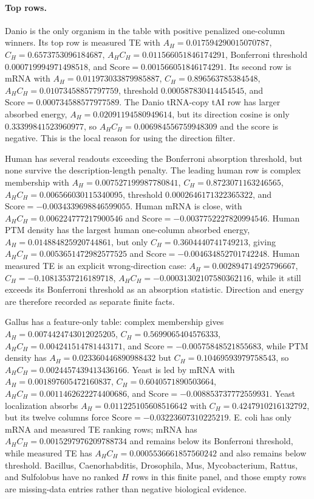 \paragraph{Top rows.}
Danio is the only organism in the table with positive penalized one-column winners.  Its top row is measured TE with $A_H=0.017594290015070787$, $C_H=0.6573753096184687$, $A_H C_H=0.011566051846174291$, Bonferroni threshold $0.000719994971498518$, and $\mathrm{Score}=0.001566051846174291$.  Its second row is mRNA with $A_H=0.011973033879985887$, $C_H=0.896563785384548$, $A_H C_H=0.01073458857797759$, threshold $0.000587830414454545$, and $\mathrm{Score}=0.000734588577977589$.  The Danio tRNA-copy tAI row has larger absorbed energy, $A_H=0.02091194580949614$, but its direction cosine is only $0.33399841523960977$, so $A_HC_H=0.006984556759948309$ and the score is negative.  This is the local reason for using the direction filter.

Human has several readouts exceeding the Bonferroni absorption threshold, but none survive the description-length penalty.  The leading human row is complex membership with $A_H=0.007527199987780841$, $C_H=0.8723071163246565$, $A_HC_H=0.006566030115340095$, threshold $0.0002646171322365322$, and $\mathrm{Score}=-0.0034339698846599055$.  Human mRNA is close, with $A_HC_H=0.006224777217900546$ and $\mathrm{Score}=-0.0037752227820994546$.  Human PTM density has the largest human one-column absorbed energy, $A_H=0.014884825920744861$, but only $C_H=0.3604440741749213$, giving $A_HC_H=0.0053651472982577525$ and $\mathrm{Score}=-0.004634852701742248$.  Human measured TE is an explicit wrong-direction case: $A_H=0.002894714925796667$, $C_H=-0.10813537216189718$, $A_HC_H=-0.00031302107580362116$, while it still exceeds its Bonferroni threshold as an absorption statistic.  Direction and energy are therefore recorded as separate finite facts.

Gallus has a feature-only table: complex membership gives $A_H=0.0074424743012025205$, $C_H=0.5699065404576333$, $A_HC_H=0.004241514781443171$, and $\mathrm{Score}=-0.00575848521855683$, while PTM density has $A_H=0.023360446890988432$ but $C_H=0.10469593979758543$, so $A_HC_H=0.0024457439413436166$.  Yeast is led by mRNA with $A_H=0.001897605472160837$, $C_H=0.6040571890503664$, $A_HC_H=0.0011462622274400686$, and $\mathrm{Score}=-0.008853737772559931$.  Yeast localization absorbs $A_H=0.011225105608516642$ with $C_H=0.4247910216132792$, but its twelve columns force $\mathrm{Score}=-0.03223607310225219$.  E. coli has only mRNA and measured TE ranking rows; mRNA has $A_HC_H=0.0015297976209788734$ and remains below its Bonferroni threshold, while measured TE has $A_HC_H=0.0005536661857560242$ and also remains below threshold.  Bacillus, Caenorhabditis, Drosophila, Mus, Mycobacterium, Rattus, and Sulfolobus have no ranked $H$ rows in this finite panel, and those empty rows are missing-data entries rather than negative biological evidence.

